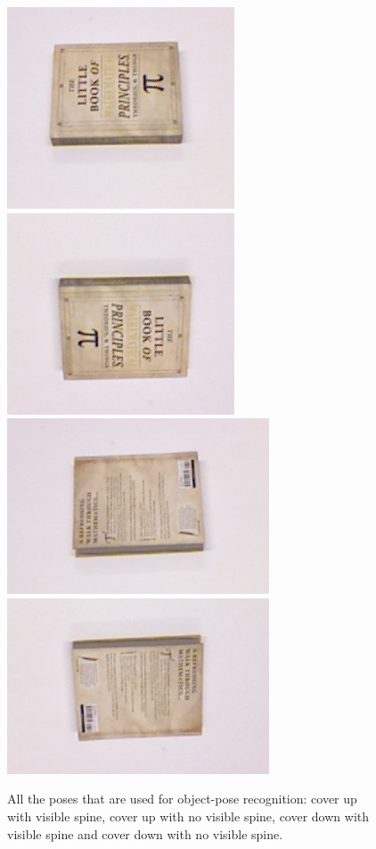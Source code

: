      \begin{figure}
    		\includegraphics[width = 0.2\columnwidth]{pics/math_cover1.jpg}
    		\includegraphics[width = 0.2\columnwidth]{pics/math_cover1_rot.jpg}
    		\includegraphics[width = 0.2\columnwidth]{pics/math_down.jpg}
    		\includegraphics[width = 0.2\columnwidth]{pics/math_down_rot.jpg}
    		\caption{All the poses that are used for object-pose recognition: cover up with visible spine, cover up with no visible spine, cover down with visible spine and cover down with no visible spine.}
	\label{fig:pose_dataset}
    \end{figure}
        
        






